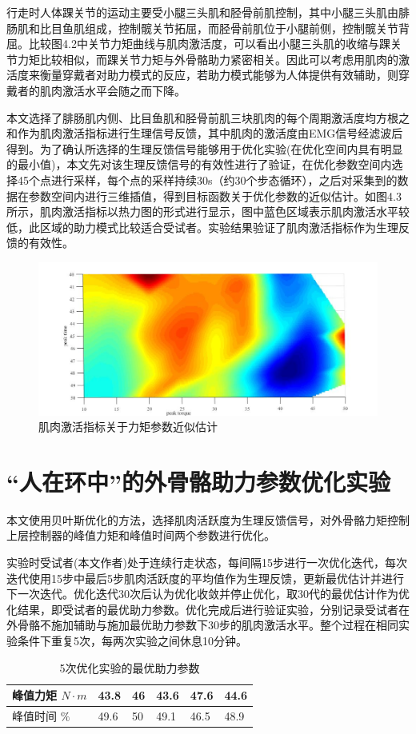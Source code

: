 行走时人体踝关节的运动主要受小腿三头肌和胫骨前肌控制，其中小腿三头肌由腓肠肌和比目鱼肌组成，控制髋关节拓屈，而胫骨前肌位于小腿前侧，控制髋关节背屈。比较图4.2中关节力矩曲线与肌肉激活度，可以看出小腿三头肌的收缩与踝关节力矩比较相似，而踝关节力矩与外骨骼助力紧密相关。因此可以考虑用肌肉的激活度来衡量穿戴者对助力模式的反应，若助力模式能够为人体提供有效辅助，则穿戴者的肌肉激活水平会随之而下降。

本文选择了腓肠肌内侧、比目鱼肌和胫骨前肌三块肌肉的每个周期激活度均方根之和作为肌肉激活指标进行生理信号反馈，其中肌肉的激活度由EMG信号经滤波后得到。为了确认所选择的生理反馈信号能够用于优化实验(在优化空间内具有明显的最小值)，本文先对该生理反馈信号的有效性进行了验证，在优化参数空间内选择45个点进行采样，每个点的采样持续30s（约30个步态循环），之后对采集到的数据在参数空间内进行三维插值，得到目标函数关于优化参数的近似估计。如图4.3所示，肌肉激活指标以热力图的形式进行显示，图中蓝色区域表示肌肉激活水平较低，此区域的助力模式比较适合受试者。实验结果验证了肌肉激活指标作为生理反馈的有效性。
\begin{figure}[!htb]
    \includegraphics[width=17cm]{fig/f63.jpg}
    \caption{肌肉激活指标关于力矩参数近似估计}
    \label{fig:mark}
\end{figure}

\section{“人在环中”的外骨骼助力参数优化实验}

本文使用贝叶斯优化的方法，选择肌肉活跃度为生理反馈信号，对外骨骼力矩控制上层控制器的峰值力矩和峰值时间两个参数进行优化。

实验时受试者(本文作者)处于连续行走状态，每间隔15步进行一次优化迭代，每次迭代使用15步中最后5步肌肉活跃度的平均值作为生理反馈，更新最优估计并进行下一次迭代。优化迭代30次后认为优化收敛并停止优化，取30代的最优估计作为优化结果，即受试者的最优助力参数。优化完成后进行验证实验，分别记录受试者在外骨骼不施加辅助与施加最优助力参数下30步的肌肉激活水平。整个过程在相同实验条件下重复5次，每两次实验之间休息10分钟。
\begin{table}[htb]
    \caption[控制参数]{5次优化实验的最优助力参数}
    \begin{tabular}{llllll}
      \toprule
        峰值力矩 $N\cdot m$ & 43.8 & 46 & 43.6 & 47.6 & 44.6 \\
      \midrule
        峰值时间 $\%$ & 49.6 & 50 & 49.1 & 46.5 & 48.9 \\
      \bottomrule
    \end{tabular}
\end{table}

